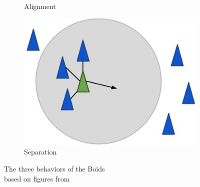 \begin{figure}[h]
\begin{subfigure}[b]{0.23\textwidth}
        \caption{Alignment}
        \label{fig:boid_ali}
    \end{subfigure}
    \hfill
    \begin{subfigure}[b]{0.3\textwidth}
        \centering
        \includegraphics[width=\textwidth]{images/boid_separation}
        \caption{Separation}
        \label{fig:boid_sep}
    \end{subfigure}
    \caption[Boids behavior]{The three behaviors of the Boids \\  based on figures from \cite{1_red3d.com_2015}}
    \label{fig:boidbehavior}
\end{figure}


